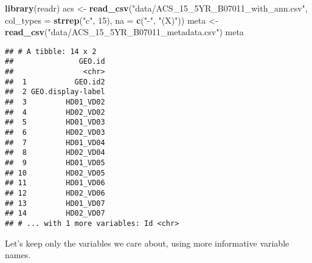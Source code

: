 \documentclass[]{book}
\newenvironment{Shaded}{\begin{snugshade}}{\end{snugshade}}
\newcommand{\KeywordTok}[1]{\textcolor[rgb]{0.13,0.29,0.53}{\textbf{{#1}}}}
\newcommand{\DataTypeTok}[1]{\textcolor[rgb]{0.13,0.29,0.53}{{#1}}}
\newcommand{\DecValTok}[1]{\textcolor[rgb]{0.00,0.00,0.81}{{#1}}}
\newcommand{\StringTok}[1]{\textcolor[rgb]{0.31,0.60,0.02}{{#1}}}
\newcommand{\NormalTok}[1]{{#1}}
\theoremstyle{definition}
\theoremstyle{definition}
\theoremstyle{remark}
\begin{document}
\begin{Shaded}
\begin{Highlighting}[]
\KeywordTok{library}\NormalTok{(readr)}
\NormalTok{acs <-}\StringTok{ }\KeywordTok{read_csv}\NormalTok{(}\StringTok{"data/ACS_15_5YR_B07011_with_ann.csv"}\NormalTok{, }\DataTypeTok{col_types =} \KeywordTok{strrep}\NormalTok{(}\StringTok{"c"}\NormalTok{, }\DecValTok{15}\NormalTok{), }\DataTypeTok{na =} \KeywordTok{c}\NormalTok{(}\StringTok{"-"}\NormalTok{, }\StringTok{"(X)"}\NormalTok{))}
\NormalTok{meta <-}\StringTok{ }\KeywordTok{read_csv}\NormalTok{(}\StringTok{"data/ACS_15_5YR_B07011_metadata.csv"}\NormalTok{)}
\NormalTok{meta}
\end{Highlighting}
\end{Shaded}

\begin{verbatim}
## # A tibble: 14 x 2
##               GEO.id
##                <chr>
##  1           GEO.id2
##  2 GEO.display-label
##  3         HD01_VD02
##  4         HD02_VD02
##  5         HD01_VD03
##  6         HD02_VD03
##  7         HD01_VD04
##  8         HD02_VD04
##  9         HD01_VD05
## 10         HD02_VD05
## 11         HD01_VD06
## 12         HD02_VD06
## 13         HD01_VD07
## 14         HD02_VD07
## # ... with 1 more variables: Id <chr>
\end{verbatim}

Let's keep only the variables we care about, using more informative
variable names.

\begin{Shaded}
\end{Shaded}
\end{document}
